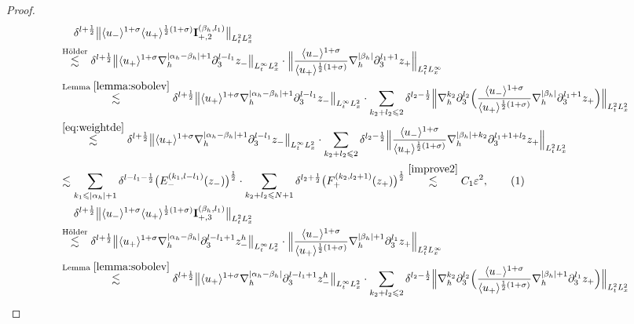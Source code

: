 \documentclass[10pt,reqno]{amsart}
\numberwithin{equation}{section}
\begin{document}
\begin{proof}
\begin{align*}
	&\ \ \ \ \delta^{l+\frac{1}{2}}\big\|\langle u_-\rangle^{1+\sigma}\langle u_+\rangle^{\frac{1}{2}(1+\sigma)}\mathbf{I}_{+,2}^{(\beta_h,l_1)}\big\|_{L^2_tL^2_x}\\
	&\stackrel{\text{H\"older}}{\lesssim} \delta^{l+\frac{1}{2}}\big\|\langle u_+\rangle^{1+\sigma}\nabla_h^{|\alpha_h-\beta_h|+1}\partial_3^{l-l_1}z_-\big\|_{L^\infty_tL^2_x}\cdot \Big\|\frac{\langle u_-\rangle^{1+\sigma}}{\langle u_+\rangle^{\frac{1}{2}(1+\sigma)}}\nabla_h^{|\beta_h|}\partial_3^{l_1+1}z_+\Big\|_{L^2_tL^\infty_x}\\
	&\stackrel{\text{Lemma } \ref{lemma:sobolev}}{\lesssim}\delta^{l+\frac{1}{2}}\big\|\langle u_+\rangle^{1+\sigma}\nabla_h^{|\alpha_h-\beta_h|+1}\partial_3^{l-l_1}z_-\big\|_{L^\infty_tL^2_x}\cdot\sum_{k_2+l_2\leqslant 2}\delta^{l_2-\frac{1}{2}}\Big\|\nabla_h^{k_2}\partial_3^{l_2}\Big(\frac{\langle u_-\rangle^{1+\sigma}}{\langle u_+\rangle^{\frac{1}{2}(1+\sigma)}}\nabla_h^{|\beta_h|}\partial_3^{l_1+1}z_+\Big)\Big\|_{L^2_tL^2_x}\\
	&\stackrel{\eqref{eq:weightde}}{\lesssim} \delta^{l+\frac{1}{2}}\big\|\langle u_+\rangle^{1+\sigma}\nabla_h^{|\alpha_h-\beta_h|+1}\partial_3^{l-l_1}z_-\big\|_{L^\infty_tL^2_x}\cdot\sum_{k_2+l_2\leqslant 2}\delta^{l_2-\frac{1}{2}}\Big\|\frac{\langle u_-\rangle^{1+\sigma}}{\langle u_+\rangle^{\frac{1}{2}(1+\sigma)}}\nabla_h^{|\beta_h|+k_2}\partial_3^{l_1+1+l_2}z_+\Big\|_{L^2_tL^2_x}\\
	&\lesssim
	  \sum_{k_1\leqslant|\alpha_h|+1}\delta^{l-l_1-\frac{1}{2}}\big(E_-^{(k_1,l-l_1)}(z_-)\big)^{\frac{1}{2}}\cdot\sum_{k_2+l_2\leqslant N+1}\delta^{l_2+\frac{1}{2}}\big(F_+^{(k_2,l_2+1)}(z_+)\big)^{\frac{1}{2}}
	  \stackrel{\eqref{improve2}}{\lesssim} C_1\varepsilon^2,\stepcounter{equation}\tag{\theequation}\label{eqA6}\\
	&\ \ \ \ \delta^{l+\frac{1}{2}}\big\|\langle u_-\rangle^{1+\sigma}\langle u_+\rangle^{\frac{1}{2}(1+\sigma)}\mathbf{I}_{+,3}^{(\beta_h,l_1)}\big\|_{L^2_tL^2_x}\\
	&\stackrel{\text{H\"older}}{\lesssim} \delta^{l+\frac{1}{2}}\big\|\langle u_+\rangle^{1+\sigma}\nabla_h^{|\alpha_h-\beta_h|}\partial_3^{l-l_1+1}z_-^h\big\|_{L^\infty_tL^2_x} \cdot  \Big\|\frac{\langle u_-\rangle^{1+\sigma}}{\langle u_+\rangle^{\frac{1}{2}(1+\sigma)}}\nabla_h^{|\beta_h|+1}\partial_3^{l_1}z_+\Big\|_{L^2_tL^\infty_x}\\
	& \stackrel{\text{Lemma } \ref{lemma:sobolev}}{\lesssim}\delta^{l+\frac{1}{2}}\big\|\langle u_+\rangle^{1+\sigma}\nabla_h^{|\alpha_h-\beta_h|}\partial_3^{l-l_1+1}z_-^h\big\|_{L^\infty_tL^2_x} \cdot \sum_{k_2+l_2\leqslant 2}\delta^{l_2-\frac{1}{2}}\Big\|\nabla_h^{k_2}\partial_3^{l_2}\Big(\frac{\langle u_-\rangle^{1+\sigma}}{\langle u_+\rangle^{\frac{1}{2}(1+\sigma)}}\nabla_h^{|\beta_h|+1}\partial_3^{l_1}z_+\Big)\Big\|_{L^2_tL^2_x}\\

\end{align*}
\end{proof}
\end{document}
